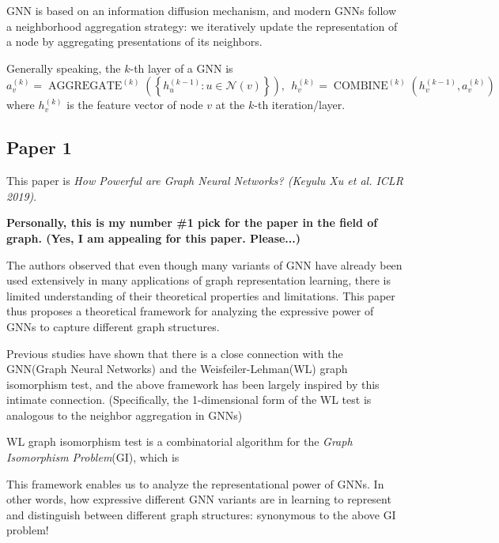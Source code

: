 \documentclass{article}
\makeatletter
\newcommand{\problemtitle}[1]{\gdef\@problemtitle{#1}}%
\newcommand{\probleminput}[1]{\gdef\@probleminput{#1}}%
\newcommand{\problemquestion}[1]{\gdef\@problemquestion{#1}}%
\DeclareMathOperator{\AGGR}{AGGREGATE}
\DeclareMathOperator{\COMB}{COMBINE}
\makeatother
\begin{document}
GNN is based on an information diffusion mechanism, and modern GNNs follow a neighborhood aggregation strategy: we iteratively update the representation of a node by aggregating presentations of its neighbors.

Generally speaking, the $k$-th layer of a GNN is
$$a_v^{(k)} = \AGGR^{(k)} \left( \left\{ h_u^{(k - 1)} : u \in \mathcal{N}(v) \right\} \right),
\ \ h_v^{(k)} = \COMB^{(k)} \left( h_v^{(k - 1)}, a_v^{(k)} \right)$$
where $h_v^{(k)}$ is the feature vector of node $v$ at the $k$-th iteration/layer.

 
\subsection{Paper 1}
\indent
This paper is \textit{How Powerful are Graph Neural Networks? (Keyulu Xu et al. ICLR 2019)}.

\textbf{Personally, this is my number \#1 pick for the paper in the field of graph. (Yes, I am appealing for this paper. Please...)}


The authors observed that even though many variants of GNN have already been used extensively in many applications of graph representation learning, there is limited understanding of their theoretical properties and limitations.
This paper thus proposes a theoretical framework for analyzing the expressive power of GNNs to capture different graph structures.

Previous studies have shown that there is a close connection with the GNN(Graph Neural Networks) and the Weisfeiler-Lehman(WL) graph isomorphism test, and the above framework has been largely inspired by this intimate connection. (Specifically, the 1-dimensional form of the WL test is analogous to the neighbor aggregation in GNNs)

WL graph isomorphism test is a combinatorial algorithm for the \textit{Graph Isomorphism Problem}(GI), which is
\begin{problem}
  \problemtitle{\textsc{Graph Isomorphism Problem}}
  \probleminput{$G_1 = (V_1, E_1)$, $G_2 = (V_2, E_2)$, $n$(: number of steps).}
  \problemquestion{Can one determine whether $G_1$ and $G_2$ are isomorphic under $n$ steps?}
\end{problem}

This framework enables us to analyze the representational power of GNNs. In other words, how expressive different GNN variants are in learning to represent and distinguish between different graph structures: synonymous to the above GI problem!
\end{document}

